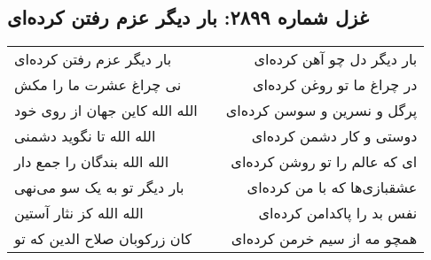 \begin{center}
\section*{غزل شماره ۲۸۹۹: بار دیگر عزم رفتن کرده‌ای}
\label{sec:2899}
\begin{longtable}{l p{0.5cm} r}
بار دیگر عزم رفتن کرده‌ای
&&
بار دیگر دل چو آهن کرده‌ای
\\
نی چراغ عشرت ما را مکش
&&
در چراغ ما تو روغن کرده‌ای
\\
الله الله کاین جهان از روی خود
&&
پرگل و نسرین و سوسن کرده‌ای
\\
الله الله تا نگوید دشمنی
&&
دوستی و کار دشمن کرده‌ای
\\
الله الله بندگان را جمع دار
&&
ای که عالم را تو روشن کرده‌ای
\\
بار دیگر تو به یک سو می‌نهی
&&
عشقبازی‌ها که با من کرده‌ای
\\
الله الله کز نثار آستین
&&
نفس بد را پاکدامن کرده‌ای
\\
کان زرکوبان صلاح الدین که تو
&&
همچو مه از سیم خرمن کرده‌ای
\\
\end{longtable}
\end{center}
